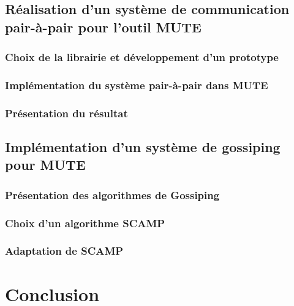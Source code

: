 \documentclass{tnreport}
\begin{document}
\section{Réalisation d'un système de communication pair-à-pair pour l'outil MUTE}

\subsection{Choix de la librairie et développement d'un prototype}

\subsection{Implémentation du système pair-à-pair dans MUTE}

\subsection{Présentation du résultat}

\section{Implémentation d'un système de gossiping pour MUTE}

\subsection{Présentation des algorithmes de Gossiping}

\subsection{Choix d'un algorithme SCAMP}

\subsection{Adaptation de SCAMP}

\chapter{Conclusion}

\cleardoublepage

\renewcommand{\tocbibname}{Bibliographie / Webographie}


\cleardoublepage

\listoffigures
\cleardoublepage
\end{document}
